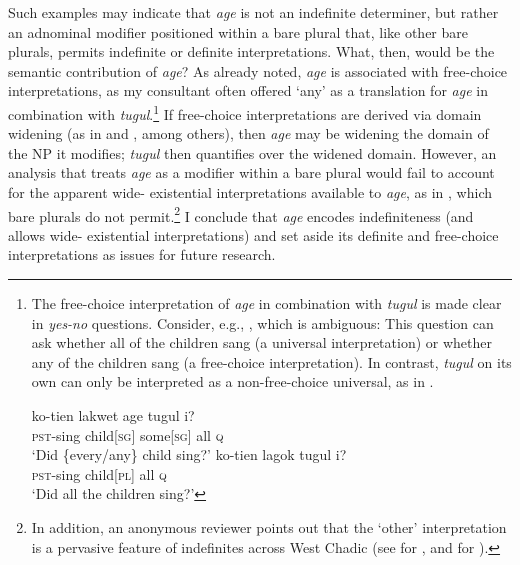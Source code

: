 \documentclass[output=paper]{LSP/langsci}
\begin{document}
\noindent Such examples may indicate that \textit{age} is not an indefinite determiner, but rather an adnominal modifier positioned within a bare plural that, like other bare plurals, permits indefinite or definite interpretations. What, then, would be the semantic contribution of \textit{age}? As already noted, \textit{age} is associated with free-choice interpretations, as my consultant often offered ‘any’ as a translation for \textit{age} in combination with \textit{tugul}.\footnote{The free-choice interpretation of \textit{age} in combination with \textit{tugul} is made clear in \textit{yes-no} questions. Consider, e.g., , which is ambiguous: This question can ask whether all of the children sang (a universal interpretation) or whether any of the children sang (a free-choice interpretation). In contrast, \textit{tugul} on its own can only be interpreted as a non-free-choice universal, as in .

\ea \label{ex:landman:freechoice}  
\gll ko-tien lakwet  age tugul i?\\
	   \textsc{pst}-sing child[\textsc{sg}] some[\textsc{sg}] all \textsc{q}\\
  \glt ‘Did \{every/any\} child sing?’
\z
\ea \label{ex:landman:tugulquestion}
\gll ko-tien lagok tugul i?\\
	   \textsc{pst}-sing child[\textsc{pl}] all \textsc{q}\\
  \glt ‘Did all the children sing?’
\z
} If free-choice interpretations are derived via domain widening (as in \citealt{Kadmon:1993} and \citealt{Kratzer:2002}, among others), then \textit{age} may be widening the domain of the NP it modifies; \textit{tugul} then quantifies over the widened domain. However, an analysis that treats \textit{age} as a modifier within a bare plural would fail to account for the apparent wide- existential interpretations available to \textit{age}, as in , which bare plurals do not permit.\footnote{In addition, an anonymous reviewer points out that the ‘other’ interpretation is a pervasive feature of indefinites across West Chadic (see \citealt{Zimmermann:2008} for , and \citealt{Grubic:2015} for ).} I conclude that \textit{age} encodes indefiniteness (and allows wide- existential interpretations) and set aside its definite and free-choice interpretations as issues for future research.
\end{document}
